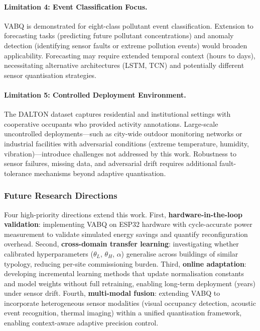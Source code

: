 \paragraph{Limitation 4: Event Classification Focus.} VABQ is demonstrated for eight-class pollutant event classification. Extension to forecasting tasks (predicting future pollutant concentrations) and anomaly detection (identifying sensor faults or extreme pollution events) would broaden applicability. Forecasting may require extended temporal context (hours to days), necessitating alternative architectures (LSTM, TCN) and potentially different sensor quantisation strategies.

\paragraph{Limitation 5: Controlled Deployment Environment.} The DALTON dataset captures residential and institutional settings with cooperative occupants who provided activity annotations. Large-scale uncontrolled deployments---such as city-wide outdoor monitoring networks or industrial facilities with adversarial conditions (extreme temperature, humidity, vibration)---introduce challenges not addressed by this work. Robustness to sensor failures, missing data, and adversarial drift requires additional fault-tolerance mechanisms beyond adaptive quantisation.

\subsubsection{Future Research Directions}

Four high-priority directions extend this work. First, \textbf{hardware-in-the-loop validation}: implementing VABQ on ESP32 hardware with cycle-accurate power measurement to validate simulated energy savings and quantify reconfiguration overhead. Second, \textbf{cross-domain transfer learning}: investigating whether calibrated hyperparameters ($\theta_L$, $\theta_H$, $\alpha$) generalise across buildings of similar typology, reducing per-site commissioning burden. Third, \textbf{online adaptation}: developing incremental learning methods that update normalisation constants and model weights without full retraining, enabling long-term deployment (years) under sensor drift. Fourth, \textbf{multi-modal fusion}: extending VABQ to incorporate heterogeneous sensor modalities (visual occupancy detection, acoustic event recognition, thermal imaging) within a unified quantisation framework, enabling context-aware adaptive precision control.

